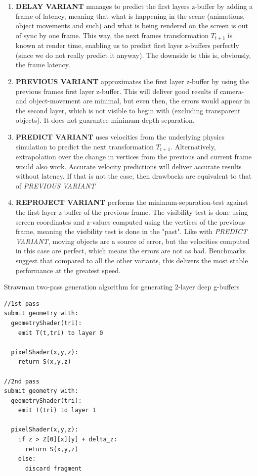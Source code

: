 \documentclass{ACGSeminar}
\begin{document}
		\begin{enumerate}
			\item \textbf{DELAY VARIANT} manages to predict the first layers z-buffer by adding a frame of latency, meaning that what is happening in the scene (animations, object movements and such) and what is being rendered on the screen is out of sync by one frame. This way, the next frames transformation $T_{t+1}$ is known at render time, enabling us to predict first layer z-buffers perfectly (since we do not really predict it anyway). The downside to this is, obviously, the frame latency.

			\item \textbf{PREVIOUS VARIANT} approximates the first layer z-buffer by using the previous frames first layer z-buffer. This will deliver good results if camera- and object-movement are minimal, but even then, the errors would appear in the second layer, which is not visible to begin with (excluding transparent objects). It does not guarantee minimum-depth-separation.

			\item \textbf{PREDICT VARIANT} uses velocities from the underlying physics simulation to predict the next transformation $T_{t+1}$. Alternatively, extrapolation over the change in vertices from the previous and current frame would also work. Accurate velocity predictions will deliver accurate results without latency. If that is not the case, then drawbacks are equivalent to that of \textit{PREVIOUS VARIANT}

			\item \textbf{REPROJECT VARIANT} performs the minimum-separation-test against the first layer z-buffer of the previous frame. The visibility test is done using screen coordinates and z-values computed using the vertices of the previous frame, meaning the visibility test is done in the "past". Like with \textit{PREDICT VARIANT}, moving objects are a source of error, but the velocities computed in this case are perfect, which means the errors are not as bad. Benchmarks suggest that compared to all the other variants, this delivers the most stable performance at the greatest speed.
		\end{enumerate} 
		\begin{algorithm} \label{two_pass_strawman} \caption{Strawman two-pass generation algorithm for generating 2-layer deep g-buffers}
		\begin{lstlisting}[frame=single]
//1st pass
submit geometry with:
  geometryShader(tri):
    emit T(t,tri) to layer 0

  pixelShader(x,y,z):
    return S(x,y,z)

//2nd pass
submit geometry with:
  geometryShader(tri):
    emit T(tri) to layer 1

  pixelShader(x,y,z):
    if z > Z[0][x][y] + delta_z:
      return S(x,y,z)
    else:
      discard fragment
		\end{lstlisting}
		\end{algorithm}
\end{document}
